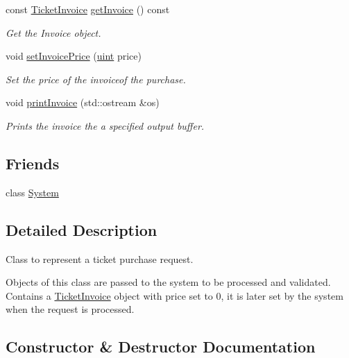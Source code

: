 \begin{DoxyCompactItemize}
const \mbox{\hyperlink{classTicketInvoice}{Ticket\+Invoice}} \mbox{\hyperlink{classTicketPurchaseRequest_a24d2aab14853b8f7c8f5487145f3d26e}{get\+Invoice}} () const
\begin{DoxyCompactList}\small\item\em Get the Invoice object. \end{DoxyCompactList}\item 
void \mbox{\hyperlink{classTicketPurchaseRequest_a35b5d38bf3d6d00f90041762f2ca93ee}{set\+Invoice\+Price}} (\mbox{\hyperlink{project__utils_8h_a91ad9478d81a7aaf2593e8d9c3d06a14}{uint}} price)
\begin{DoxyCompactList}\small\item\em Set the price of the invoiceof the purchase. \end{DoxyCompactList}\item 
void \mbox{\hyperlink{classTicketPurchaseRequest_a626107dad44c79663d318573e5c6bae2}{print\+Invoice}} (std\+::ostream \&os)
\begin{DoxyCompactList}\small\item\em Prints the invoice the a specified output buffer. \end{DoxyCompactList}\end{DoxyCompactItemize}
\subsection*{Friends}
\begin{DoxyCompactItemize}
\item 
class \mbox{\hyperlink{classTicketPurchaseRequest_af18a9ee98e70982bfe2975391d7221a5}{System}}
\end{DoxyCompactItemize}


\subsection{Detailed Description}
Class to represent a ticket purchase request. 

Objects of this class are passed to the system to be processed and validated. Contains a \mbox{\hyperlink{classTicketInvoice}{Ticket\+Invoice}} object with price set to 0, it is later set by the system when the request is processed. 

\subsection{Constructor \& Destructor Documentation}
\mbox{\label{classTicketPurchaseRequest_aaa01be19b8a8ef88428f4d1dc3a3c63c}} 

